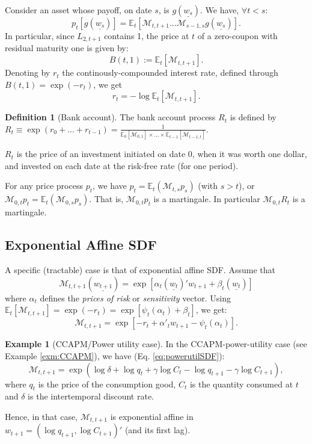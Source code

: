 \documentclass[
  12pt,
]{book}
\theoremstyle{definition}
\newtheorem{definition}{Definition}[chapter]
\theoremstyle{definition}
\newtheorem{example}{Example}[chapter]
\theoremstyle{definition}
\theoremstyle{definition}
\theoremstyle{remark}
\begin{document}
Consider an asset whose payoff, on date \(s\), is \(g(\underline{w_s})\). We have, \(\forall t < s\):
\begin{equation}
\boxed{p_t[g(\underline{w_s})] = \mathbb{E}_t[\mathcal{M}_{t,t+1}...\mathcal{M}_{s-1,s}g(\underline{w_s})].}\label{eq:basic}
\end{equation}
In particular, since \(L_{2,t+1}\) contains 1, the price at \(t\) of a zero-coupon with residual maturity one is given by:
\[
B(t,1) := \mathbb{E}_t [\mathcal{M}_{t,t+1}].
\]
Denoting by \(r_t\) the continously-compounded interest rate, defined through \(B(t,1)=\exp(-r_{t})\), we get
\[
r_{t}=-\log \mathbb{E}_t [\mathcal{M}_{t,t+1}].
\]

\begin{definition}[Bank account]
\protect\hypertarget{def:bankaccount}{}\label{def:bankaccount}The bank account process \(R_t\) is defined by \(R_{t} \equiv \exp(r_0+...+r_{t-1}) = \frac{1}{\mathbb{E}_0[ \mathcal{M}_{0,1}]\times ... \times \mathbb{E}_{t-1} [\mathcal{M}_{t-1,t}]}\).

\(R_t\) is the price of an investment initiated on date 0, when it was worth one dollar, and invested on each date at the risk-free rate (for one period).
\end{definition}

For any price process \(p_t\), we have \(p_t = \mathbb{E}_t(\mathcal{M}_{t,s} p_s)\) (with \(s>t\)), or \(\mathcal{M}_{0,t} p_t = \mathbb{E}_t(\mathcal{M}_{0,s}p_s)\). That is, \(\mathcal{M}_{0,t} p_t\) is a martingale. In particular \(\mathcal{M}_{0,t} R_t\) is a martingale.

\hypertarget{PricingAffine}{%
\subsection{Exponential Affine SDF}\label{PricingAffine}}

A specific (tractable) case is that of exponential affine SDF. Assume that
\[
\mathcal{M}_{t,t+1}(\underline{w_{t+1}}) = \exp[\alpha_t(\underline{w_t})'w_{t+1}+\beta_t(\underline{w_t})]
\]
where \(\alpha_t\) defines the \emph{prices of risk} or \emph{sensitivity} vector. Using \(\mathbb{E}_t[\mathcal{M}_{t,t+1}]=\exp(-r_{t})=\exp[\psi_t(\alpha_t)+\beta_t]\), we get:
\begin{equation}
\mathcal{M}_{t,t+1} = \exp[-r_{t}+\alpha'_tw_{t+1}-\psi_t(\alpha_t)].\label{eq:keySDF}
\end{equation}

\begin{example}[CCAPM/Power utility case]
In the CCAPM-power-utility case (see Example \ref{exm:CCAPM}), we have (Eq. \eqref{eq:powerutilSDF}):
\[
\mathcal{M}_{t,t+1} = \exp(\log \delta + \log q_t + \gamma \log   C_t - \log   q_{t+1} - \gamma  \log   C_{t+1}),
\]
where \(q_t\) is the price of the consumption good, \(C_t\) is the quantity consumed at \(t\) and \(\delta\) is the intertemporal discount rate.

Hence, in that case, \(\mathcal{M}_{t,t+1}\) is exponential affine in \(w_{t+1} = (\log q_{t+1}, \log C_{t+1})'\) (and its first lag).
\end{example}
\end{document}

